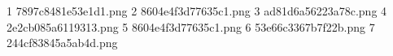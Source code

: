 1 7897c8481e53e1d1.png
2 8604e4f3d77635c1.png
3 ad81d6a56223a78c.png
4 2e2cb085a6119313.png
5 8604e4f3d77635c1.png
6 53e66c3367b7f22b.png
7 244cf83845a5ab4d.png
